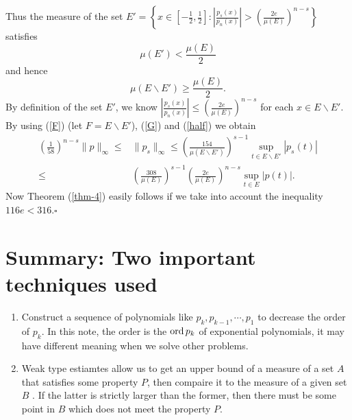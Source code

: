      Thus the measure of the set $E' = \left\{ x \in \left[ -\frac{1}{2},\frac{1}{2} \right] :\left| \frac{p_s(x)}{p_n(x)}\right|> \left( \frac{2e}{\mu(E)} \right)^{n-s}  \right\} $ satisfies
     \[
       \mu(E')< \frac{\mu(E)}{2}
     \] 
     and hence
     \begin{equation}
       \mu(E\backslash E')\ge  \frac{\mu(E)}{2}.\label{half}
     \end{equation}
     By definition of the set $E'$, we know $\left| \frac{p_s(x)}{p_n(x)} \right| \le \left( \frac{2e}{\mu(E)} \right) ^{n-s}$ for each $x\in E\backslash E'$.
     By using (\ref{F}) (let $F=E\backslash E'$), (\ref{G}) and (\ref{half}) we obtain
     \begin{equation*}
       \begin{aligned}
	 \left( \frac{1}{58} \right) ^{n-s}\|p\|_{\infty}\le & \|p_s\|_{\infty}\le \left( \frac{154}{\mu\left( E\backslash E' \right) } \right)^{s-1} \sup_{t\in E\backslash E'}\left| p_s(t) \right|\\
	 \le  & \left( \frac{308}{\mu(E)} \right) ^{s-1}\left( \frac{2e}{\mu(E)} \right) ^{n-s}\sup_{t\in E}\left| p(t) \right| .
       \end{aligned}
     \end{equation*}
     Now Theorem (\ref{thm-4}) easily follows if we take into account the inequality $116e<316$.\hfill $\square$\par

 \section{Summary: Two important techniques used}
 \begin{enumerate}
   \item Construct a sequence of polynomials like $p_k,p_{k-1},\cdots,p_1$ to decrease the order of $p_k$. In this note, the order is the  $\operatorname{ord} p_k$ of exponential polynomials, it may have different meaning when we solve other problems. 
   \item Weak type estiamtes allow us to get an upper bound of a measure of a set $A$ that satisfies some property $P$, then compaire it  to the measure of a given set $B$ . If the latter is strictly larger than  the former, then there must be some point in  $B$ which does not  meet the property $P$.
 \end{enumerate}
